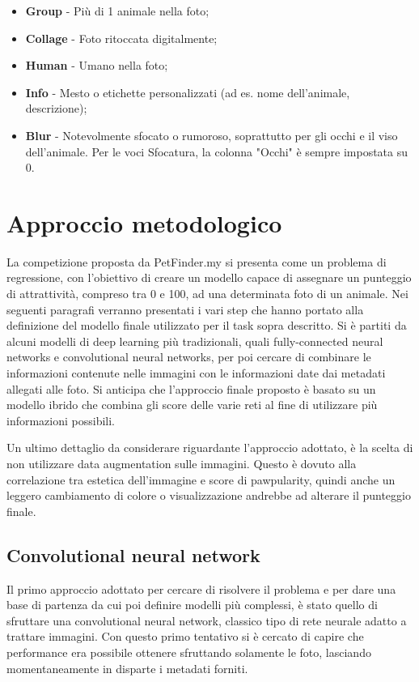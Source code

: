 \begin{itemize}
        \item \textbf{Group} - Più di 1 animale nella foto;
        \item \textbf{Collage} - Foto ritoccata digitalmente;
        \item \textbf{Human} - Umano nella foto;
        \item \textbf{Info} - Mesto o etichette personalizzati (ad es. nome dell'animale, descrizione);
        \item \textbf{Blur} - Notevolmente sfocato o rumoroso, soprattutto per gli occhi e il viso dell'animale. Per le voci Sfocatura, la colonna "Occhi" è sempre impostata su 0.
    \end{itemize}
    

\section{Approccio metodologico}

    La competizione proposta da PetFinder.my si presenta come un problema di regressione, con l'obiettivo di creare un modello capace di assegnare un punteggio di attrattività, 
    compreso tra 0 e 100, ad una determinata foto di un animale.
    Nei seguenti paragrafi verranno presentati i vari step che hanno portato alla definizione del modello finale utilizzato per il task sopra descritto.
    Si è partiti da alcuni modelli di deep learning più tradizionali, quali fully-connected neural networks e convolutional neural networks, per poi cercare di combinare le informazioni
    contenute nelle immagini con le informazioni date dai metadati allegati alle foto.
    Si anticipa che l'approccio finale proposto è basato su un modello ibrido che combina gli score delle varie reti al fine di utilizzare più informazioni possibili.
    
    Un ultimo dettaglio da considerare riguardante l'approccio adottato, è la scelta di non utilizzare data augmentation sulle immagini. Questo è dovuto alla correlazione tra estetica dell'immagine e score di pawpularity, quindi anche un leggero cambiamento di colore o visualizzazione andrebbe ad alterare il punteggio finale. 

    \subsection{Convolutional neural network}
    \label{cnn}
        Il primo approccio adottato per cercare di risolvere il problema e per dare una base di partenza da cui poi definire modelli più complessi, è stato quello di sfruttare
        una convolutional neural network, classico tipo di rete neurale adatto a trattare immagini. Con questo primo tentativo si è cercato di capire che performance era possibile
        ottenere sfruttando solamente le foto, lasciando momentaneamente in disparte i metadati forniti.

